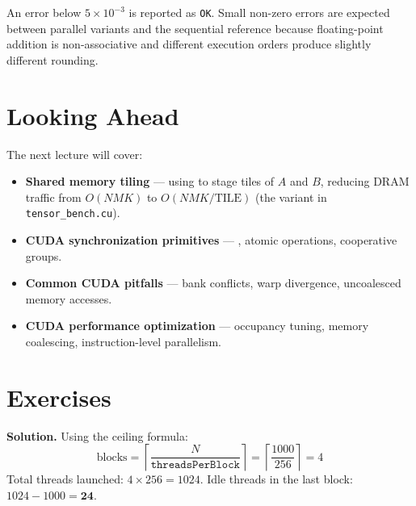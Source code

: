 An error below $5 \times 10^{-3}$ is reported as \texttt{OK}. Small non-zero
errors are expected between parallel variants and the sequential reference
because floating-point addition is non-associative and different execution
orders produce slightly different rounding.

\section{Looking Ahead}
\label{sec:looking-ahead}
 
The next lecture will cover:
\begin{itemize}
  \item \textbf{Shared memory tiling} --- using  to
    stage tiles of $A$ and $B$, reducing DRAM traffic from $O(NMK)$ to
    $O(NMK/\text{TILE})$ (the  variant in
    \texttt{tensor\_bench.cu}).
  \item \textbf{CUDA synchronization primitives} ---
    , atomic operations, cooperative groups.
  \item \textbf{Common CUDA pitfalls} --- bank conflicts, warp divergence,
    uncoalesced memory accesses.
  \item \textbf{CUDA performance optimization} --- occupancy tuning,
    memory coalescing, instruction-level parallelism.
\end{itemize}
 
\section{Exercises}
\label{sec:exercises}

\begin{ppexercises}
\end{ppexercises}

\textbf{Solution.}
Using the ceiling formula:
\[
  \text{blocks}
  = \left\lceil \frac{N}{\texttt{threadsPerBlock}} \right\rceil
  = \left\lceil \frac{1000}{256} \right\rceil
  = 4
\]
Total threads launched: $4 \times 256 = 1024$.
Idle threads in the last block: $1024 - 1000 = \mathbf{24}$.

